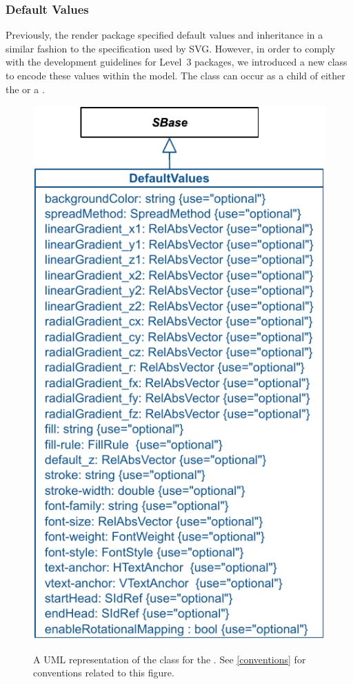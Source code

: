 \subsubsection{Default Values}
\label{defaultvalues-class}
Previously, the render package specified default values and inheritance in a similar fashion to the specification used by SVG. However, in order to comply with the \SBML 
development guidelines for Level~3 packages, we introduced a new class \DefaultValues to encode these values within the model. 
The \DefaultValues class can occur as a child of either the \ListOfGlobalRenderInformation or a 
\ListOfLocalRenderInformation. 

\begin{figure}[!ht]
  \centering
  \includegraphics{images/render-default-values}\\
  \caption{A UML representation of the \DefaultValues class for the \RenderPackage.  See \ref{conventions} for conventions related to this figure. }
  \label{fig:default-values}
\end{figure}

